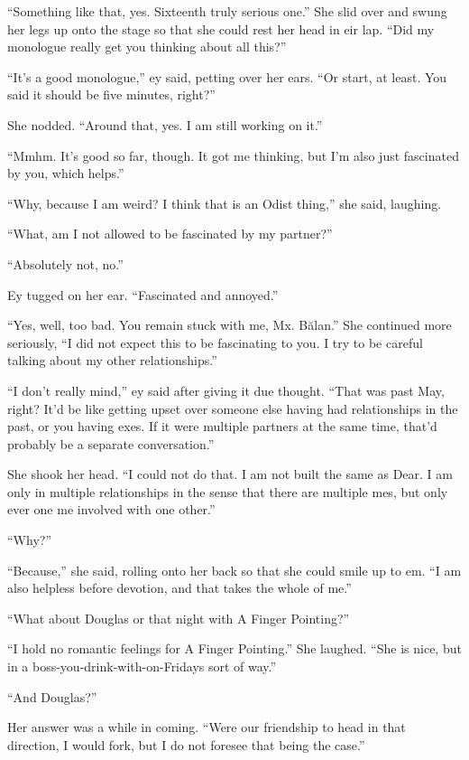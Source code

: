 ``Something like that, yes. Sixteenth truly serious one.'' She slid over and swung her legs up onto the stage so that she could rest her head in eir lap. ``Did my monologue really get you thinking about all this?''

``It's a good monologue,'' ey said, petting over her ears. ``Or start, at least. You said it should be five minutes, right?''

She nodded. ``Around that, yes. I am still working on it.''

``Mmhm. It's good so far, though. It got me thinking, but I'm also just fascinated by you, which helps.''

``Why, because I am weird? I think that is an Odist thing,'' she said, laughing.

``What, am I not allowed to be fascinated by my partner?''

``Absolutely not, no.''

Ey tugged on her ear. ``Fascinated and annoyed.''

``Yes, well, too bad. You remain stuck with me, Mx. Bălan.'' She continued more seriously, ``I did not expect this to be fascinating to you. I try to be careful talking about my other relationships.''

``I don't really mind,'' ey said after giving it due thought. ``That was past May, right? It'd be like getting upset over someone else having had relationships in the past, or you having exes. If it were multiple partners at the same time, that'd probably be a separate conversation.''

She shook her head. ``I could not do that. I am not built the same as Dear. I am only in multiple relationships in the sense that there are multiple mes, but only ever one me involved with one other.''

``Why?''

``Because,'' she said, rolling onto her back so that she could smile up to em. ``I am also helpless before devotion, and that takes the whole of me.''

``What about Douglas or that night with A Finger Pointing?''

``I hold no romantic feelings for A Finger Pointing.'' She laughed. ``She is nice, but in a boss-you-drink-with-on-Fridays sort of way.''

``And Douglas?''

Her answer was a while in coming. ``Were our friendship to head in that direction, I would fork, but I do not foresee that being the case.''

